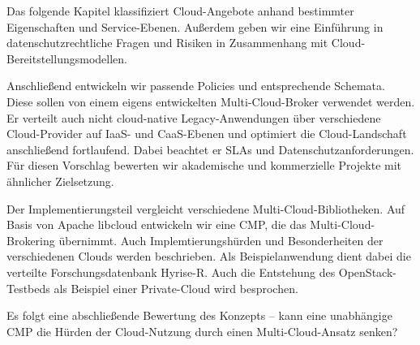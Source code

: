 Das folgende Kapitel klassifiziert Cloud-Angebote anhand bestimmter Eigenschaften und Service-Ebenen. Außerdem geben wir eine Einführung in datenschutzrechtliche Fragen und Risiken in Zusammenhang mit Cloud-Bereit\-stel\-lungs\-model\-len.

Anschließend entwickeln wir passende Policies und entsprechende Schemata. Diese sollen von einem eigens entwickelten Multi-Cloud-Broker verwendet werden. Er verteilt auch nicht cloud-native Legacy-Anwendungen über verschiedene Cloud-Provider auf IaaS- und CaaS-Ebenen und optimiert die Cloud-Landschaft anschließend fortlaufend. Dabei beachtet er SLAs und Datenschutzanforderungen. Für diesen Vorschlag bewerten wir akademische und kommerzielle Projekte mit ähnlicher Zielsetzung.

Der Implementierungsteil vergleicht verschiedene Multi-Cloud-Bibliotheken. Auf Basis von Apache libcloud entwickeln wir eine CMP, die das Multi-Cloud-Brokering übernimmt. Auch Implemtierungshürden und Besonderheiten der verschiedenen Clouds werden beschrieben. Als Beispielanwendung dient dabei die verteilte Forschungsdatenbank Hyrise-R. Auch die Entstehung des OpenStack-Testbeds als Beispiel einer Private-Cloud wird besprochen.

Es folgt eine abschließende Bewertung des Konzepts -- kann eine unabhängige CMP die Hürden der Cloud-Nutzung durch einen Multi-Cloud-Ansatz senken?

%
